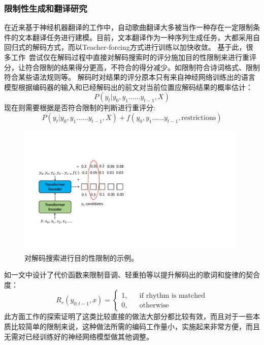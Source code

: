 \subsubsection{限制性生成和翻译研究}
在近来基于神经机器翻译的工作\citep{gagast}中，自动歌曲翻译大多被当作一种存在一定限制条件的文本翻译任务进行建模。目前，文本翻译作为一种序列生成任务，大都采用自回归式的解码方式，而以Teacher-forcing方式进行训练以加快收敛。
基于此，很多工作~\citep{hokamp-liu-2017-lexically,zou_controllable,relyme}尝试仅在解码过程中直接对解码搜索时的评分施加目的性限制来进行重评分，让符合限制的结果得分更高，不符合的得分减少。如限制符合诗词格式、限制符合某些语法规则等。
解码时对结果的评分原本只有来自神经网络训练出的语言模型根据编码器的输入和已经解码出的前文对当前位置应解码结果的概率估计：
\begin{equation}
  P(y_t|y_0,y_1......y_{t-1}, X)
\end{equation}
现在则需要根据是否符合限制的判断进行重评分:
\begin{equation}
  P(y_t|y_0,y_1......y_{t-1}, X)+f(y_0,y_1......y_{t-1}, \mbox{restrictions})
\end{equation}
\begin{figure}[t]
  \includegraphics[width=0.99\textwidth]{figure/related/decoded_constrain.pdf}
  \caption{对解码搜索进行目的性限制的示例。}
\end{figure}
如\citet{relyme}一文中设计了代价函数来限制音调、轻重拍等以提升解码出的歌词和旋律的契合度：
\begin{equation*}
  R_r(y_{0:t-1},x) = \left\{
  \begin{array}{rcl}
    1, & & {\mbox{if rhythm is matched}} \\
    0, & & {\mbox{otherwise}}
  \end{array}
  \right.
\end{equation*}
%
此方面工作的探索证明了这类比较直接的做法大部分都比较有效，而且对于一些本质比较简单的限制来说，这种做法所需的编码工作量小，实施起来非常方便，而且无需对已经训练好的神经网络模型做其他调整。

